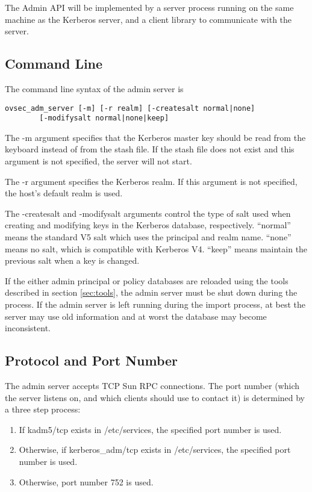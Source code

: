 The Admin API will be implemented by a server process running on the
same machine as the Kerberos server, and a client library to
communicate with the server.

\subsection{Command Line}
\label{sec:commandline}

The command line syntax of the admin server is

\begin{verbatim}
ovsec_adm_server [-m] [-r realm] [-createsalt normal|none]
        [-modifysalt normal|none|keep] 
\end{verbatim}

The -m argument specifies that the Kerberos master key should be read
from the keyboard instead of from the stash file.  If the stash file
does not exist and this argument is not specified, the server will
not start.

The -r argument specifies the Kerberos realm.  If this argument is not
specified, the host's default realm is used. 

The -createsalt and -modifysalt arguments control the type of salt
used when creating and modifying keys in the Kerberos database,
respectively.  ``normal'' means the standard V5 salt which uses the
principal and realm name.  ``none'' means no salt, which is compatible
with Kerberos V4.  ``keep'' means maintain the previous salt when a
key is changed.

If the either admin principal or policy databases are reloaded using
the tools described in section \ref{sec:tools}, the admin server must
be shut down during the process.  If the admin server is left running
during the import process, at best the server may use old information
and at worst the database may become inconsistent.

\subsection{Protocol and Port Number}

The admin server accepts TCP Sun RPC connections.  The port number
(which the server listens on, and which clients should use to contact
it) is determined by a three step process:

\begin{enumerate}
\item If kadm5/tcp exists in /etc/services, the specified port
number is used.

\item Otherwise, if kerberos_adm/tcp exists in /etc/services, the
specified port number is used.

\item Otherwise, port number 752 is used.
\end{enumerate}

